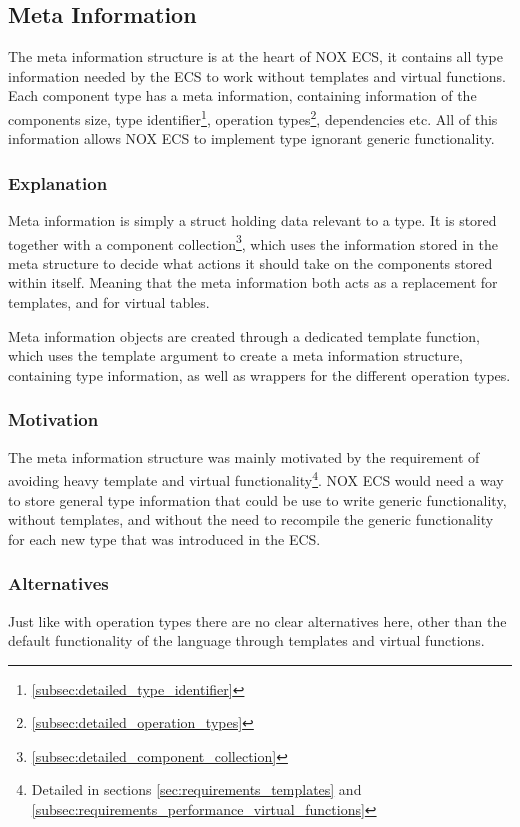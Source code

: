 \subsection{Meta Information}
\label{subsec:detailed_meta_information}
The meta information structure is at the heart of NOX ECS,
it contains all type information needed by the ECS to work without
templates and virtual functions.
Each component type has a meta information, containing information
of the components size, type identifier\footnote{\ref{subsec:detailed_type_identifier}},
operation types\footnote{\ref{subsec:detailed_operation_types}}, dependencies  etc.
All of this information allows NOX ECS to implement type ignorant generic functionality.

\subsubsection{Explanation}
Meta information is simply a struct holding data relevant to a type.
It is stored together with a component collection\footnote{\ref{subsec:detailed_component_collection}},
which uses the information stored in the meta structure to decide what actions
it should take on the components stored within itself.
Meaning that the meta information both acts as a replacement for templates,
and for virtual tables.

Meta information objects are created through a dedicated template function,
which uses the template argument to create a meta information structure,
containing type information, as well as wrappers for the different operation types.

\subsubsection{Motivation}
The meta information structure was mainly motivated by the requirement of avoiding heavy template and virtual functionality\footnote{Detailed in sections \ref{sec:requirements_templates} and \ref{subsec:requirements_performance_virtual_functions}}.
NOX ECS would need a way to store general type information that could be use to write generic functionality, without templates,
and without the need to recompile the generic functionality for each new type that was introduced in the ECS.

\subsubsection{Alternatives}
Just like with operation types there are no clear alternatives here, other than
the default functionality of the language through templates and virtual functions.

